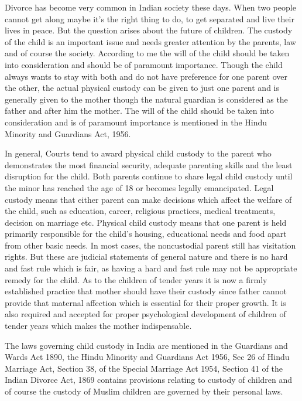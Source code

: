 \begin{multicols}{2}
\vspace{-.1cm}

\noi
Divorce has become very common in Indian society these days. When two people cannot get
along maybe it’s the right thing to do, to get separated and live their lives in peace. But the
question arises about the future of children. The custody of the child is an important issue and
needs greater attention by the parents, law and of course the society. According to me the will of
the child should be taken into consideration and should be of paramount importance. Though the
child always wants to stay with both and do not have preference for one parent over the other, the
actual physical custody can be given to just one parent and is generally given to the mother though
the natural guardian is considered as the father and after him the mother. The will of the child
should be taken into consideration and is of paramount importance is mentioned in the Hindu
Minority and Guardians Act, 1956.

\vspace{-.1cm}

\noi
In general, Courts tend to award physical child custody to the parent who demonstrates the most
financial security, adequate parenting skills and the least disruption for the child. Both parents
continue to share legal child custody until the minor has reached the age of 18 or becomes legally
emancipated. Legal custody means that either parent can make decisions which affect the welfare
of the child, such as education, career, religious practices, medical treatments, decision on
marriage etc. Physical child custody means that one parent is held primarily responsible for the
child's housing, educational needs and food apart from other basic needs. In most cases, the noncustodial parent still has visitation rights. But these are judicial statements of general nature and
there is no hard and fast rule which is fair, as having a hard and fast rule may not be appropriate
remedy for the child. As to the children of tender years it is now a firmly established practice that
mother should have their custody since father cannot provide that maternal affection which is
essential for their proper growth. It is also required and accepted for proper psychological
development of children of tender years which makes the mother indispensable.

\vspace{-.1cm}

\noi
The laws governing child custody in India are mentioned in the Guardians and Wards Act 1890,
the Hindu Minority and Guardians Act 1956, Sec 26 of Hindu Marriage Act, Section 38, of the 
Special Marriage Act 1954, Section 41 of the Indian Divorce Act, 1869 contains provisions
relating to custody of children and of course the custody of Muslim children are governed by their
personal laws.


\end{multicols}

